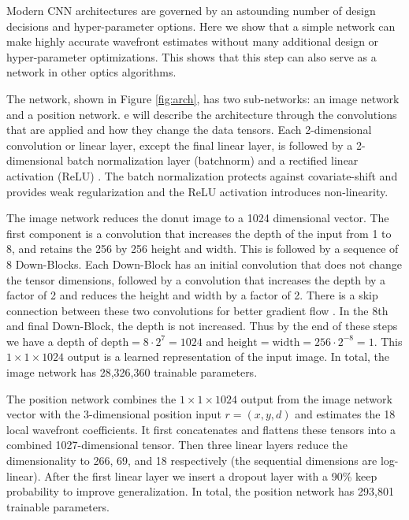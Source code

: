 Modern CNN architectures are governed by an astounding number of design decisions and hyper-parameter options. Here we show that a simple network can make highly accurate wavefront estimates without many additional design or hyper-parameter optimizations. This shows that this step can also serve as a network in other optics algorithms.

The network, shown in Figure \ref{fig:arch}, has two sub-networks: an image network and a position network. e will describe the architecture through the convolutions that are applied and how they change the data tensors. Each 2-dimensional convolution or linear layer, except the final linear layer, is followed by a 2-dimensional batch normalization layer (batchnorm) and a rectified linear activation (ReLU) \cite{726791, batchnorm, relu}. The batch normalization protects against covariate-shift and provides weak regularization and the ReLU activation introduces non-linearity. 

The image network reduces the donut image to a 1024 dimensional vector. The first component is a convolution that increases the depth of the input from 1 to 8, and retains the 256 by 256 height and width. This is followed by a sequence of 8 Down-Blocks. Each Down-Block has an initial convolution that does not change the tensor dimensions, followed by a convolution that increases the depth by a factor of 2 and reduces the height and width by a factor of 2. There is a skip connection between these two convolutions for better gradient flow \cite{resnet}. In the 8th and final Down-Block, the depth is not increased. Thus by the end of these steps we have a depth of $\text{depth} = 8 \cdot 2^7 = 1024$ and $\text{height} = \text{width} = 256 \cdot 2^{-8} = 1$. This $1 \times 1 \times 1024$ output is a learned representation of the input image. In total, the image network has 28,326,360 trainable parameters.

The position network combines the $1 \times 1 \times 1024$ output from the image network vector with the 3-dimensional position input $r=(x,y,d)$ and estimates the 18 local wavefront coefficients. It first concatenates and flattens these tensors into a combined 1027-dimensional tensor. Then three linear layers reduce the dimensionality to 266, 69, and 18 respectively (the sequential dimensions are log-linear). After the first linear layer we insert a dropout layer with a 90\% keep probability \cite{10.5555/2999134.2999257} to improve generalization. In total, the position network has 293,801 trainable parameters. 

